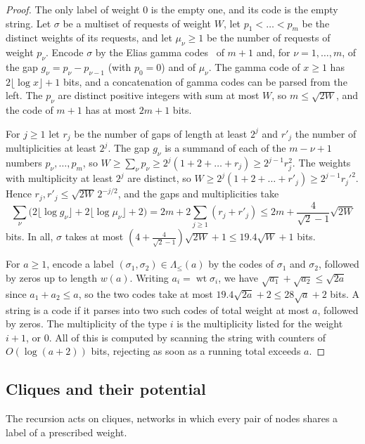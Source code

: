 \documentclass[11pt]{article}
\theoremstyle{definition}
\theoremstyle{definition}
\theoremstyle{remark}
\newcommand{\wt}{\operatorname{wt}}
\begin{document}
\begin{proof}
The only label of weight $0$ is the empty one, and its code is the empty string. Let $\sigma$ be a multiset of requests of weight $W$, let $p_1<\dots<p_m$ be the distinct weights of its requests, and let $\mu_\nu\ge1$ be the number of requests of weight $p_\nu$. Encode $\sigma$ by the Elias gamma codes~\cite{Eli75} of $m+1$ and, for $\nu=1,\dots,m$, of the gap $g_\nu=p_\nu-p_{\nu-1}$ (with $p_0=0$) and of $\mu_\nu$. The gamma code of $x\ge1$ has $2\lfloor\log x\rfloor+1$ bits, and a concatenation of gamma codes can be parsed from the left. The $p_\nu$ are distinct positive integers with sum at most $W$, so $m\le\sqrt{2W}$, and the code of $m+1$ has at most $2m+1$ bits.

For $j\ge1$ let $r_j$ be the number of gaps of length at least $2^j$ and $r'_j$ the number of multiplicities at least $2^j$. The gap $g_\nu$ is a summand of each of the $m-\nu+1$ numbers $p_\nu,\dots,p_m$, so $W\ge\sum_\nu p_\nu\ge2^j(1+2+\dots+r_j)\ge2^{j-1}r_j^2$. The weights with multiplicity at least $2^j$ are distinct, so $W\ge2^j(1+2+\dots+r'_j)\ge2^{j-1}r_j'^2$. Hence $r_j,r'_j\le\sqrt{2W}\,2^{-j/2}$, and the gaps and multiplicities take
\[
\sum_\nu\bigl(2\lfloor\log g_\nu\rfloor+2\lfloor\log\mu_\nu\rfloor+2\bigr)=2m+2\sum_{j\ge1}(r_j+r'_j)\le2m+\frac4{\sqrt2-1}\sqrt{2W}
\]
bits. In all, $\sigma$ takes at most $(4+\frac4{\sqrt2-1})\sqrt{2W}+1\le19.4\sqrt W+1$ bits.

For $a\ge1$, encode a label $(\sigma_1,\sigma_2)\in\Lambda_{\le}(a)$ by the codes of $\sigma_1$ and $\sigma_2$, followed by zeros up to length $w(a)$. Writing $a_i=\wt\sigma_i$, we have $\sqrt{a_1}+\sqrt{a_2}\le\sqrt{2a}$ since $a_1+a_2\le a$, so the two codes take at most $19.4\sqrt{2a}+2\le28\sqrt a+2$ bits. A string is a code if it parses into two such codes of total weight at most $a$, followed by zeros. The multiplicity of the type $i$ is the multiplicity listed for the weight $i+1$, or $0$. All of this is computed by scanning the string with counters of $O(\log(a+2))$ bits, rejecting as soon as a running total exceeds $a$.
\end{proof}

\subsection{Cliques and their potential}\label{sec:cliques}

The recursion acts on cliques, networks in which every pair of nodes shares a label of a prescribed weight.
\end{document}
